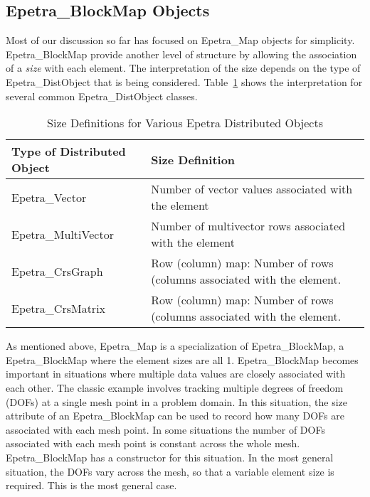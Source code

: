 \documentclass[12pt,relax]{EpetraUserGuide}
\newcommand{\map}{Epetra\_Map}
\newcommand{\blockmap}{Epetra\_BlockMap}
\renewcommand{\vector}{Epetra\_Vector}
\newcommand{\multivector}{Epetra\_MultiVector}
\newcommand{\crsgraph}{Epetra\_CrsGraph}
\newcommand{\crsmatrix}{Epetra\_CrsMatrix}
\newcommand{\distobject}{Epetra\_DistObject}
\begin{document}

\subsection{\blockmap{} Objects}

Most of our discussion so far has focused on \map{} objects for simplicity.  \blockmap{}
provide another level of structure by allowing the association of a {\it size} with each
element.  The interpretation of the size depends on the type of \distobject{} that is
being considered.  Table~\ref{Table:SizeDefinitions} shows the interpretation for several 
common \distobject{} classes.
\begin{table}
\begin{center}
\begin{tabular}{ | p{7.5cm} | p{7.5cm} | }
\hline\hline
Type of Distributed Object & Size Definition \\\hline
\vector{} & Number of vector values associated with the element \\\hline
\multivector{} & Number of multivector rows associated with the element \\\hline
\crsgraph{} & Row (column) map: Number of rows (columns associated with the element. \\\hline
\crsmatrix{} & Row (column) map: Number of rows (columns associated with the element. \\\hline
\hline
\end{tabular}
\caption{Size Definitions for Various Epetra Distributed Objects}
\label{Table:SizeDefinitions}
\end{center}
\end{table}

As mentioned above, \map{} is a specialization of \blockmap{}, a \blockmap{} where the
element sizes are all 1.  \blockmap{} becomes important in situations where multiple data values
are closely associated with each other.  The classic example involves tracking multiple degrees of
freedom (DOFs) at a single mesh point in a problem domain.  In this situation, the size attribute of an
\blockmap{} can be used to record how many DOFs are associated with each mesh point.  In some situations
the number of DOFs associated with each mesh point is constant across the whole mesh.  \blockmap{} has
a constructor for this situation.  In the most general situation, the DOFs vary across the mesh, so that
a variable element size is required.  This is the most general case.
\end{document}
